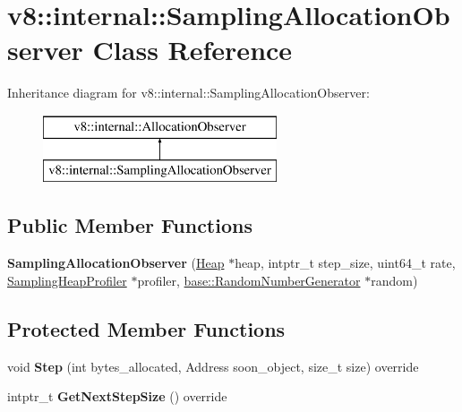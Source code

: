 \hypertarget{classv8_1_1internal_1_1_sampling_allocation_observer}{}\section{v8\+:\+:internal\+:\+:Sampling\+Allocation\+Observer Class Reference}
\label{classv8_1_1internal_1_1_sampling_allocation_observer}
Inheritance diagram for v8\+:\+:internal\+:\+:Sampling\+Allocation\+Observer\+:\begin{figure}[H]
\begin{center}
\leavevmode
\includegraphics[height=2.000000cm]{classv8_1_1internal_1_1_sampling_allocation_observer}
\end{center}
\end{figure}
\subsection*{Public Member Functions}
\begin{DoxyCompactItemize}
\item 
{\bfseries Sampling\+Allocation\+Observer} (\hyperlink{classv8_1_1internal_1_1_heap}{Heap} $\ast$heap, intptr\+\_\+t step\+\_\+size, uint64\+\_\+t rate, \hyperlink{classv8_1_1internal_1_1_sampling_heap_profiler}{Sampling\+Heap\+Profiler} $\ast$profiler, \hyperlink{classv8_1_1base_1_1_random_number_generator}{base\+::\+Random\+Number\+Generator} $\ast$random)\hypertarget{classv8_1_1internal_1_1_sampling_allocation_observer_a60bf25c58608f2666d0843666145b554}{}\label{classv8_1_1internal_1_1_sampling_allocation_observer_a60bf25c58608f2666d0843666145b554}

\end{DoxyCompactItemize}
\subsection*{Protected Member Functions}
\begin{DoxyCompactItemize}
\item 
void {\bfseries Step} (int bytes\+\_\+allocated, Address soon\+\_\+object, size\+\_\+t size) override\hypertarget{classv8_1_1internal_1_1_sampling_allocation_observer_a3b95036f997dfdc2a581f50de752f80f}{}\label{classv8_1_1internal_1_1_sampling_allocation_observer_a3b95036f997dfdc2a581f50de752f80f}

\item 
intptr\+\_\+t {\bfseries Get\+Next\+Step\+Size} () override\hypertarget{classv8_1_1internal_1_1_sampling_allocation_observer_aae9dd259b530e7993fbb241a0406dd2a}{}\label{classv8_1_1internal_1_1_sampling_allocation_observer_aae9dd259b530e7993fbb241a0406dd2a}

\end{DoxyCompactItemize}
